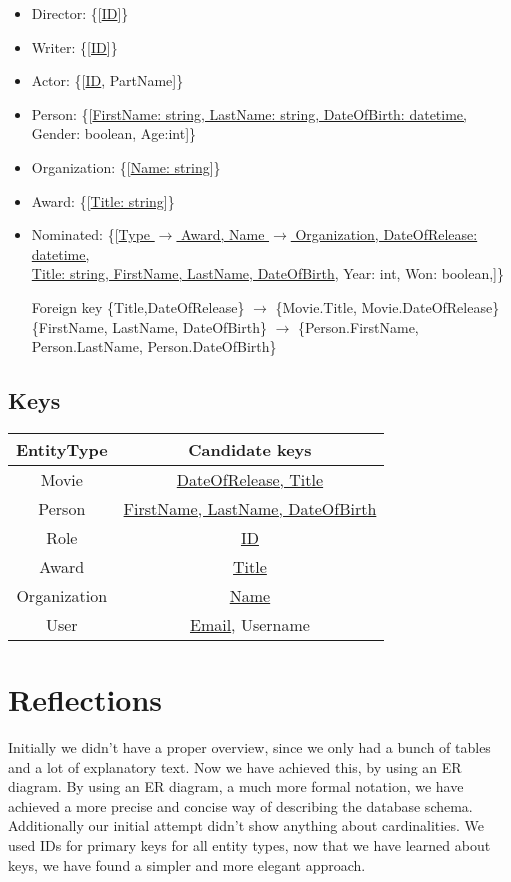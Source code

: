 \begin{itemize}
\item Director: \{[\underline{ID}]\}

\item Writer: \{[\underline{ID}]\}

\item Actor: \{[\underline{ID}, PartName]\}

\item Person: \{[\underline{FirstName: string, LastName: string, DateOfBirth: datetime,} Gender: boolean, Age:int]\}

\item Organization: \{[\underline{Name: string}]\}

\item Award: \{[\underline{Title: string}]\}

\item Nominated: \{[\underline{Type $ \rightarrow $ Award, Name $ \rightarrow $ Organization, DateOfRelease: datetime,}\\ \underline{Title: string, FirstName, LastName, DateOfBirth}, Year: int, Won: boolean,]\}

Foreign key \{Title,DateOfRelease\} $ \rightarrow $ \{Movie.Title, Movie.DateOfRelease\}
		\{FirstName, LastName, DateOfBirth\} $ \rightarrow $ \{Person.FirstName, Person.LastName, 
Person.DateOfBirth\}
\end{itemize}

\subsection{Keys}

\begin{tabular}{| c | c |}
\hline
EntityType & Candidate keys\\
\hline 
\hline
Movie & \underline{DateOfRelease, Title}\\
\hline
Person & \underline{FirstName, LastName, DateOfBirth}\\
\hline
Role & \underline{ID}\\
\hline
\hline 
Award & \underline{Title}\\
\hline
Organization & \underline{Name}\\
\hline
User & \underline{Email}, Username\\
\hline
\end{tabular}

\section{Reflections}
Initially we didn't have a proper overview, since we only had a bunch of tables and a lot of explanatory text.
Now we have achieved this, by using an ER diagram.
By using an ER diagram, a much more formal notation, we have achieved a more precise and concise way of describing the database schema.
Additionally our initial attempt didn't show anything about cardinalities.
We used IDs for primary keys for all entity types, now that we have learned about keys, we have found a simpler and more elegant approach.
